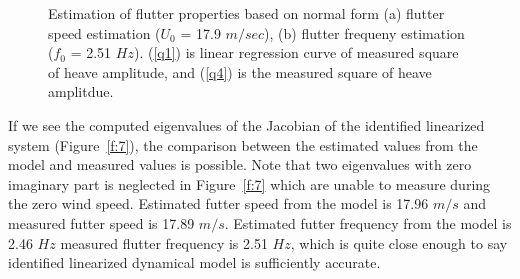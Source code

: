 \documentclass[openacc]{rsproca_new}%
\newcommand{\Fref}[1]{Figure~\ref{#1}}
\begin{document}
\begin{figure}[!ht]
  \centering
\caption{Estimation of flutter properties based on normal form (a) flutter speed estimation ($U_0$ = 17.9 $m/sec$), (b) flutter frequeny estimation ($f_0$ = 2.51 $Hz$). (\ref{q1}) is linear regression curve of measured square of heave amplitude, and (\ref{q4}) is the measured square of heave amplitdue.}
\label{f:6}
\end{figure}

If we see the computed eigenvalues of the Jacobian of the identified linearized system (\Fref{f:7}), the comparison between the estimated values from the model and measured values is possible. Note that two eigenvalues with zero imaginary part is neglected in \Fref{f:7} which are unable to measure during the zero wind speed. Estimated futter speed from the model is 17.96 $m/s$ and measured futter speed is 17.89 $m/s$. Estimated futter frequency from the model is 2.46 $Hz$ measured flutter frequency is 2.51 $Hz$, which is quite close enough to say identified linearized dynamical model is sufficiently accurate.
\end{document}
